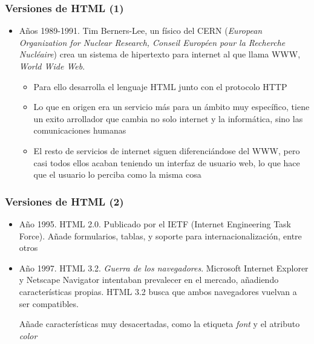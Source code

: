 \documentclass[ucs]{beamer}
\begin{document}
\begin{frame}[fragile]
\frametitle{Versiones de HTML (1)}
\begin{itemize}
\item
Años 1989-1991. Tim Berners-Lee, un físico del CERN (\emph{European Organization for Nuclear Research, 
Conseil Européen pour la Recherche Nucléaire}) crea un sistema
de hipertexto para internet al que llama WWW,
\emph{World Wide Web}.



    \begin{itemize}
    \item
Para ello desarrolla el lenguaje HTML
junto con el protocolo HTTP 
    \item
Lo que en origen era un servicio más para un ámbito muy específico, 
tiene un exito arrollador que cambia no solo internet y la informática,
sino las comunicaciones humanas
    \item
El resto de servicios de internet siguen diferenciándose del WWW, pero casi
todos ellos acaban teniendo un interfaz de usuario web, lo que hace que
el usuario lo perciba como la misma cosa
    \end{itemize}


\end{itemize}
\end{frame}

\begin{frame}[fragile]
\frametitle{Versiones de HTML (2)}
\begin{itemize}

\item
Año 1995. HTML 2.0. Publicado por el IETF (Internet Engineering Task Force). Añade formularios, tablas,
y soporte para internacionalización, entre otros

\item
Año 1997. HTML 3.2. 
\emph{Guerra de los navegadores}. Microsoft Internet Explorer y Netscape Navigator
intentaban prevalecer en el mercado, añadiendo características propias.
HTML 3.2 busca que ambos navegadores vuelvan a ser compatibles.

Añade características  muy desacertadas, como la etiqueta 
\emph{font}
y el atributo
\emph{color} 


\end{itemize}

\end{frame}
\end{document}
